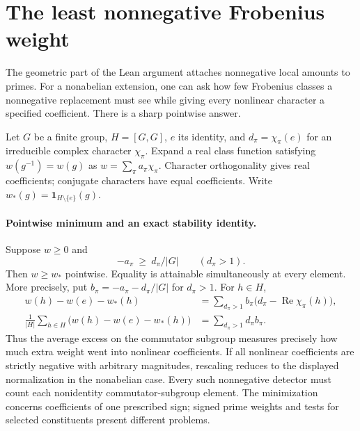 \section{The least nonnegative Frobenius weight}
\label{sec:detector}
The geometric part of the Lean argument attaches nonnegative local amounts to primes. For a nonabelian extension, one can ask how few Frobenius classes a nonnegative replacement must see while giving every nonlinear character a specified coefficient. There is a sharp pointwise answer.

Let $G$ be a finite group, $H=[G,G]$, $e$ its identity, and $d_\pi=\chi_\pi(e)$ for an irreducible complex character $\chi_\pi$. Expand a real class function satisfying $w(g^{-1})=w(g)$ as $w=\sum_\pi a_\pi\chi_\pi$. Character orthogonality gives real coefficients; conjugate characters have equal coefficients. Write $w_*(g)=\mathbf{1}_{H\setminus\{e\}}(g)$.

\paragraph{Pointwise minimum and an exact stability identity.}
Suppose $w\ge0$ and
\[
             -a_\pi\ \ge\ d_\pi/|G| \qquad(d_\pi>1).
\]
Then $w\ge w_*$ pointwise. Equality is attainable simultaneously at every element. More precisely, put $b_\pi=-a_\pi-d_\pi/|G|$ for $d_\pi>1$. For $h\in H$,
\begin{align*}
 w(h)-w(e)-w_*(h)&=
  \sum_{d_\pi>1} b_\pi\bigl(d_\pi-\operatorname{Re}\chi_\pi(h)\bigr),\\
 \frac1{|H|}\sum_{h\in H}\bigl(w(h)-w(e)-w_*(h)\bigr)
 &=\sum_{d_\pi>1} d_\pi b_\pi .
\end{align*}
Thus the average excess on the commutator subgroup measures precisely how much extra weight went into nonlinear coefficients. If all nonlinear coefficients are strictly negative with arbitrary magnitudes, rescaling reduces to the displayed normalization in the nonabelian case. Every such nonnegative detector must count each nonidentity commutator-subgroup element. The minimization concerns coefficients of one prescribed sign; signed prime weights and tests for selected constituents present different problems.

